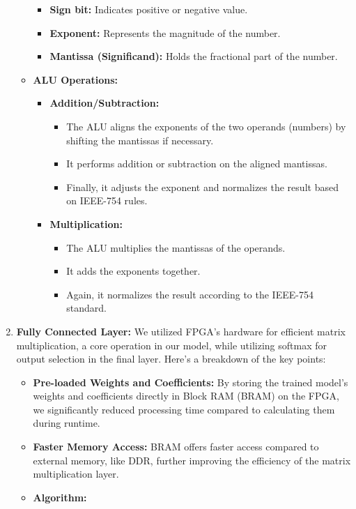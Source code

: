 \documentclass{article}
\begin{document}
\begin{enumerate}
\begin{itemize}
\begin{itemize}
    \item \textbf{Sign bit:} Indicates positive or negative value.
    \item \textbf{Exponent:} Represents the magnitude of the number.
    \item \textbf{Mantissa (Significand):} Holds the fractional part of the number.
\end{itemize}
\item\textbf{ALU Operations:}
\begin{itemize}
    \item \textbf{Addition/Subtraction:}
\begin{itemize}
        \item The ALU aligns the exponents of the two operands (numbers) by shifting the mantissas if necessary.
        \item It performs addition or subtraction on the aligned mantissas.
        \item Finally, it adjusts the exponent and normalizes the result based on IEEE-754 rules.
\end{itemize}

    \item \textbf{Multiplication:}

\begin{itemize}
        \item The ALU multiplies the mantissas of the operands.
        \item It adds the exponents together.
        \item Again, it normalizes the result according to the IEEE-754 standard.
\end{itemize}

 
            \end{itemize}
          \end{itemize} 
           \item  \textbf{Fully Connected Layer: }
             We utilized FPGA's hardware for efficient matrix multiplication, a core operation in our model, while utilizing softmax for output selection in the final layer. Here's a breakdown of the key points:

\begin{itemize}
    \item \textbf{Pre-loaded Weights and Coefficients:} By storing the trained model's weights and coefficients directly in Block RAM (BRAM) on the FPGA, we significantly reduced processing time compared to calculating them during runtime.
    \item \textbf{Faster Memory Access:} BRAM offers faster access compared to external memory, like DDR, further improving the efficiency of the matrix multiplication layer.
     \item \textbf{Algorithm:}


\end{itemize}
\end{enumerate}
\end{document}
